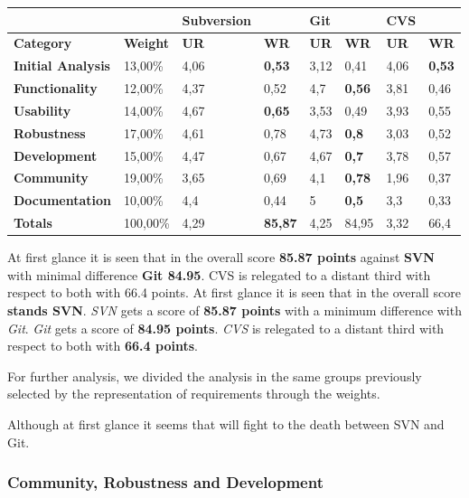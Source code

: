 \documentclass[11pt]{scrartcl}
\begin{document}
\begin{tabular}{|l|l|l|l|l|l|l|l|}
    \hline
     &  & {\bf Subversion} &   & {\bf Git} &  & {\bf CVS} &  \\
    \hline
    {\bf Category} & {\bf Weight} & {\bf UR} & {\bf WR} & {\bf UR} & {\bf WR} & {\bf UR} & {\bf WR}\\
    \hline
    {\bf Initial Analysis} & 13,00\% & 4,06 & {\bf 0,53} & 3,12 & 0,41 & 4,06 & {\bf 0,53}\\
    \hline
    {\bf Functionality} & 12,00\% & 4,37 & 0,52 & 4,7 & {\bf 0,56} & 3,81 & 0,46\\
    \hline
    {\bf Usability} & 14,00\% & 4,67 & {\bf 0,65} & 3,53 & 0,49 & 3,93 & 0,55\\
    \hline
    {\bf Robustness} & 17,00\% & 4,61 & 0,78 & 4,73 & {\bf 0,8} & 3,03 & 0,52\\
    \hline
    {\bf Development} & 15,00\% & 4,47 & 0,67 & 4,67 & {\bf 0,7} & 3,78 & 0,57\\
    \hline
    {\bf Community} & 19,00\% & 3,65 & 0,69 & 4,1 & {\bf 0,78} & 1,96 & 0,37\\
    \hline
    {\bf Documentation} & 10,00\% & 4,4 & 0,44 & 5 & {\bf 0,5} & 3,3 & 0,33\\
    \hline
    {\bf Totals} & 100,00\% & 4,29 & {\bf 85,87} & 4,25 & 84,95 & 3,32 & 66,4\\
    \hline
\end{tabular}

\par At first glance it is seen that in the overall score \textbf{85.87 points} against \textbf{SVN} with minimal difference \textbf{Git 84.95}. CVS is relegated to a distant third with respect to both with 66.4 points.
At first glance it is seen that in the overall score \textbf{stands SVN}. \emph{SVN} gets a score of \textbf{85.87 points} with a minimum difference with \emph{Git}. \emph{Git} gets a score of \textbf{84.95 points}. \emph{CVS} is relegated to a distant third with respect to both with \textbf{66.4 points}.

\par For further analysis, we divided the analysis in the same groups previously selected by the representation of requirements through the weights.

\par Although at first glance it seems that will fight to the death between SVN and Git.

\subsubsection{Community, Robustness and Development}
\end{document}
